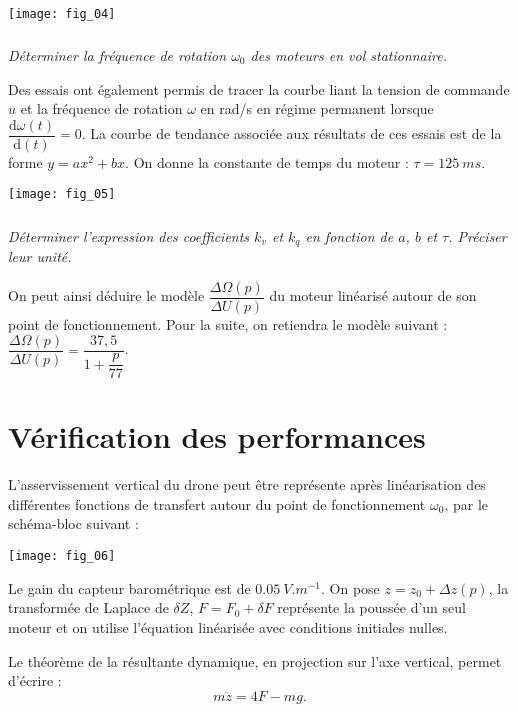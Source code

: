 \begin{multicols}{2}
\begin{center}
\texttt{[image: fig\_04]}
\end{center}

\subparagraph{}\textit{Déterminer la fréquence de rotation $\omega_0$ des
moteurs en vol stationnaire.}




Des essais ont également permis de tracer la
courbe liant la tension de commande $u$ et la
fréquence de rotation $\omega$ en rad/s en régime
permanent lorsque $\dfrac{\text{d}\omega(t)}{\text{d}(t)}=0$. La courbe de tendance associée aux résultats de
ces essais est de la forme $y=ax^2+bx$. On donne la constante de temps du moteur :
$\tau=\SI{125}{ms}$.

\begin{center}
\texttt{[image: fig\_05]}
\end{center}

\subparagraph{}\textit{Déterminer l'expression des coefficients $k_v$ et $k_q$ en fonction de $a$, $b$ et $\tau$. Préciser leur unité.}

On peut ainsi déduire le modèle $\dfrac{\Delta \Omega(p)}{\Delta U(p)}$ du moteur linéarisé autour de son point de fonctionnement. Pour la suite, on retiendra le modèle suivant : $\dfrac{\Delta \Omega(p)}{\Delta U(p)}=\dfrac{37,5}{1+\dfrac{p}{77}}$.

\section*{Vérification des performances}

L'asservissement vertical du drone peut être représente après linéarisation des différentes fonctions de
transfert autour du point de fonctionnement $\omega_0$, par le schéma-bloc suivant :

\begin{center}
\texttt{[image: fig\_06]}
\end{center}



Le gain du capteur barométrique est de $\SI{0,05}{V.m^{-1}}$. On pose $z=z_0+\Delta z(p)$, la transformée de Laplace de $\delta Z$, $F=F_0 + \delta F$ représente la poussée d'un seul moteur et on utilise l'équation linéarisée avec conditions initiales nulles.

Le théorème de la résultante dynamique, en projection sur l’axe vertical, permet d’écrire :
$$ m\ddot{z} =4F-mg. $$



\end{multicols}
